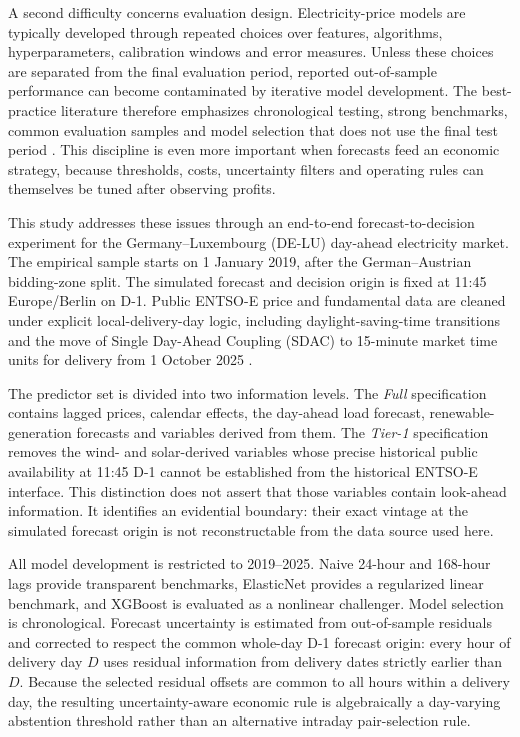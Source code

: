 A second difficulty concerns evaluation design. Electricity-price models are typically developed through repeated choices over features, algorithms, hyperparameters, calibration windows and error measures. Unless these choices are separated from the final evaluation period, reported out-of-sample performance can become contaminated by iterative model development. The best-practice literature therefore emphasizes chronological testing, strong benchmarks, common evaluation samples and model selection that does not use the final test period \citep{weron2014,lago2021}. This discipline is even more important when forecasts feed an economic strategy, because thresholds, costs, uncertainty filters and operating rules can themselves be tuned after observing profits.

This study addresses these issues through an end-to-end forecast-to-decision experiment for the Germany--Luxembourg (DE-LU) day-ahead electricity market. The empirical sample starts on 1 January 2019, after the German--Austrian bidding-zone split. The simulated forecast and decision origin is fixed at 11:45 Europe/Berlin on D-1. Public ENTSO-E price and fundamental data are cleaned under explicit local-delivery-day logic, including daylight-saving-time transitions and the move of Single Day-Ahead Coupling (SDAC) to 15-minute market time units for delivery from 1 October 2025 \citep{entsoe2025}.

The predictor set is divided into two information levels. The \emph{Full} specification contains lagged prices, calendar effects, the day-ahead load forecast, renewable-generation forecasts and variables derived from them. The \emph{Tier-1} specification removes the wind- and solar-derived variables whose precise historical public availability at 11:45 D-1 cannot be established from the historical ENTSO-E interface. This distinction does not assert that those variables contain look-ahead information. It identifies an evidential boundary: their exact vintage at the simulated forecast origin is not reconstructable from the data source used here.

All model development is restricted to 2019--2025. Naive 24-hour and 168-hour lags provide transparent benchmarks, ElasticNet provides a regularized linear benchmark, and XGBoost is evaluated as a nonlinear challenger. Model selection is chronological. Forecast uncertainty is estimated from out-of-sample residuals and corrected to respect the common whole-day D-1 forecast origin: every hour of delivery day \(D\) uses residual information from delivery dates strictly earlier than \(D\). Because the selected residual offsets are common to all hours within a delivery day, the resulting uncertainty-aware economic rule is algebraically a day-varying abstention threshold rather than an alternative intraday pair-selection rule.

